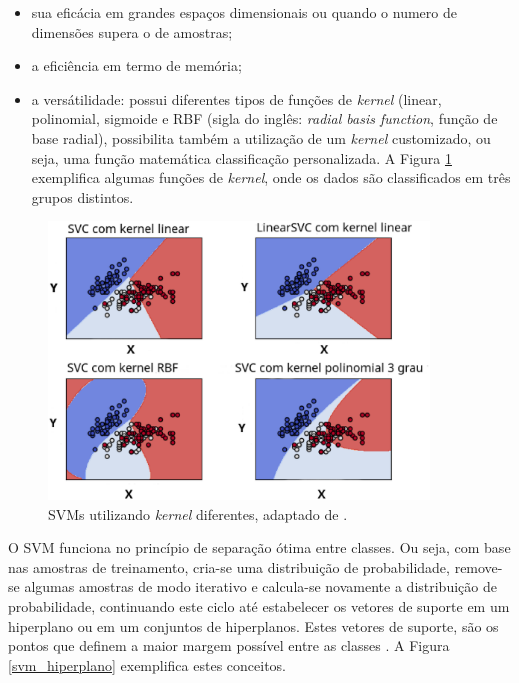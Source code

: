 \begin{itemize}
    \item sua eficácia em grandes espaços dimensionais ou quando o numero de dimensões supera o de amostras;
    \item a eficiência em termo de memória;
    \item a versátilidade: possui diferentes tipos de funções de \textit{kernel} (linear, polinomial, sigmoide e RBF (sigla do inglês: \textit{radial basis function}, função de base radial), possibilita também a utilização de um \textit{kernel} customizado, ou seja, uma função matemática classificação personalizada. A Figura \ref{svmkernel} exemplifica algumas funções de \textit{kernel}, onde os dados são classificados em três grupos distintos.
\end{itemize}

\begin{figure}[!htb]
    \centering
     \includegraphics[width=0.9\textwidth]{figuras/svmkernel.eps}
     \caption{SVMs utilizando \textit{kernel} diferentes, adaptado de .}
     \label{svmkernel}
 \end{figure}

 O SVM funciona no princípio de separação ótima entre classes. Ou seja, com base nas amostras de treinamento, cria-se uma distribuição de probabilidade, remove-se algumas amostras de modo iterativo e calcula-se novamente a distribuição de probabilidade, continuando este ciclo até estabelecer os vetores de suporte em um hiperplano ou em um conjuntos de hiperplanos. Estes vetores de suporte, são os pontos que definem a maior margem possível entre as classes \cite{huang2002assessment}. A Figura \ref{svm_hiperplano} exemplifica estes conceitos.

